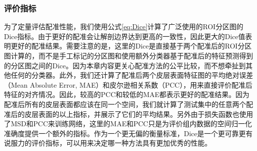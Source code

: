\subsubsection{评价指标}\label{sec:配准的评价指标}
为了定量评估配准性能，我们使用公式\ref{eq:Dice}计算了广泛使用的ROI分区图的Dice指标\cite{dice1945measures}。由于更好的配准会让解剖边界达到更高的一致性，因此更大的Dice值表明更好的配准结果。需要注意的是，这里的Dice是直接基于两个配准后的ROI分区图计算的，而不是手工标记的分区图和使用额外分类器基于配准后的特征预测得到的分区图之间的Dice。因为本章内容更关心配准方法的公平比较，而不想牵扯到其他任何的分类器。此外，我们还计算了配准后两个皮层表面特征图的平均绝对误差（Mean Absolute Error, MAE）和皮尔逊相关系数（PCC），用来直接评价配准后特征的对齐情况。因此，较高的PCC和较低的MAE都表示更好的配准结果。因为配准后所有的皮层表面都应该在同一个空间，我们就计算了测试集中的任意两个配准后的皮层表面的以上指标，并展示了它们的平均结果。另外由于损失函数也使用了MSD和PCC来训练网络，这里的MAE和PCC只是为评价组内数据的空间归一化准确度提供一个额外的指标。作为一个更无偏的衡量标准，Dice是一个更可靠更有说服力的评价指标，可以用来决定哪一种方法具有更加优秀的性能\cite{rohlfing2011image}。

